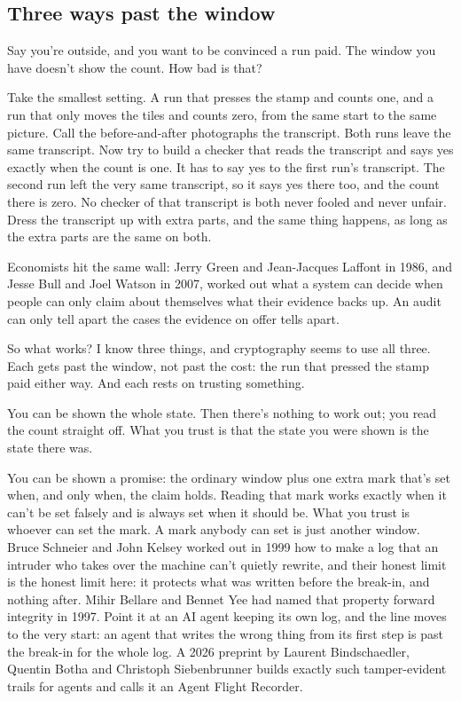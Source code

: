\documentclass[11pt,twoside]{article}
\theoremstyle{thielethm}
\theoremstyle{thieledef}
\theoremstyle{thieledef}
\theoremstyle{thieledef}
\theoremstyle{thielethm}
\theoremstyle{thieleobs}
\theoremstyle{thielethm}
\begin{document}
\subsection{Three ways past the window}

Say you're outside, and you want to be convinced a run paid. The window you have doesn't show the count. How bad is that?

Take the smallest setting. A run that presses the stamp and counts one, and a run that only moves the tiles and counts zero, from the same start to the same picture. Call the before-and-after photographs the transcript. Both runs leave the same transcript. Now try to build a checker that reads the transcript and says yes exactly when the count is one. It has to say yes to the first run's transcript. The second run left the very same transcript, so it says yes there too, and the count there is zero. No checker of that transcript is both never fooled and never unfair. Dress the transcript up with extra parts, and the same thing happens, as long as the extra parts are the same on both.

Economists hit the same wall: Jerry Green and Jean-Jacques Laffont in 1986, and Jesse Bull and Joel Watson in 2007, worked out what a system can decide when people can only claim about themselves what their evidence backs up. An audit can only tell apart the cases the evidence on offer tells apart.

So what works? I know three things, and cryptography seems to use all three. Each gets past the window, not past the cost: the run that pressed the stamp paid either way. And each rests on trusting something.

You can be shown the whole state. Then there's nothing to work out; you read the count straight off. What you trust is that the state you were shown is the state there was.

You can be shown a promise: the ordinary window plus one extra mark that's set when, and only when, the claim holds. Reading that mark works exactly when it can't be set falsely and is always set when it should be. What you trust is whoever can set the mark. A mark anybody can set is just another window. Bruce Schneier and John Kelsey worked out in 1999 how to make a log that an intruder who takes over the machine can't quietly rewrite, and their honest limit is the honest limit here: it protects what was written before the break-in, and nothing after. Mihir Bellare and Bennet Yee had named that property forward integrity in 1997. Point it at an AI agent keeping its own log, and the line moves to the very start: an agent that writes the wrong thing from its first step is past the break-in for the whole log. A 2026 preprint by Laurent Bindschaedler, Quentin Botha and Christoph Siebenbrunner builds exactly such tamper-evident trails for agents and calls it an Agent Flight Recorder.
\end{document}
